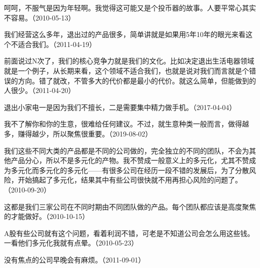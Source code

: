 呵呵，不服气是因为年轻啊。我觉得这可能又是个投币器的故事。人要平常心其实不容易。（2010-05-13）


我们经营这么多年，退出过的产品很多，简单讲就是如果用5年10年的眼光来看这个不适合我们。（2011-04-19）

前面说过N次了，我们的核心竞争力就是我们的文化。比如决定退出生活电器领域就是一个例子，从长期来看，这个领域不适合我们，也就是说对我们而言就是个错误的方向。错了就改，不管多大的代价都是最小的代价。就这么简单，但能做到的人很少。（2011-04-20）


退出小家电一是因为我们不擅长，二是需要集中精力做手机。（2017-04-04）


我不了解你和你的生意，很难给任何建议。不过，就生意种类一般而言，做得越多，赚得越少，所以聚焦很重要。（2019-08-02）


我们这些不同大类的产品都是不同的公司做的，完全独立的不同的团队，不会为其他产品分心，所以不是多元化的产物。我不赞成一般意义上的多元化，尤其不赞成为多元化而多元化的多元化——有很多公司在经历一段不错的发展后，为了分散风险，开始搞起了多元化，结果其中有些公司很快就不用再担心风险的问题了。（2010-09-20）


这都是我们三家公司在不同时期由不同团队做的产品。每个团队都应该是高度聚焦的才能做好。（2010-10-15）


A股有些公司就有这个问题，看着利润不错，可老是不知道公司会怎么用这些钱。一看他们多元化我就有点晕。（2010-05-23）


没有焦点的公司早晚会有麻烦。（2011-09-01）


